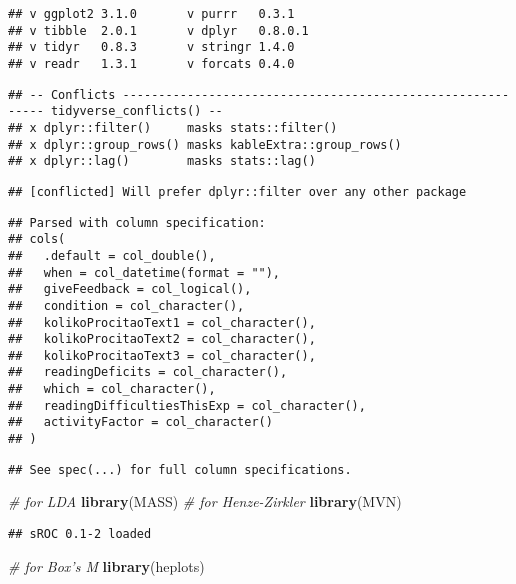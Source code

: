 \documentclass[12pt,]{article}
\newenvironment{Shaded}{\begin{snugshade}}{\end{snugshade}}
\newcommand{\CommentTok}[1]{\textcolor[rgb]{0.56,0.35,0.01}{\textit{#1}}}
\newcommand{\KeywordTok}[1]{\textcolor[rgb]{0.13,0.29,0.53}{\textbf{#1}}}
\newcommand{\NormalTok}[1]{#1}
\begin{document}
\begin{verbatim}
## v ggplot2 3.1.0       v purrr   0.3.1  
## v tibble  2.0.1       v dplyr   0.8.0.1
## v tidyr   0.8.3       v stringr 1.4.0  
## v readr   1.3.1       v forcats 0.4.0
\end{verbatim}

\begin{verbatim}
## -- Conflicts ----------------------------------------------------------- tidyverse_conflicts() --
## x dplyr::filter()     masks stats::filter()
## x dplyr::group_rows() masks kableExtra::group_rows()
## x dplyr::lag()        masks stats::lag()
\end{verbatim}

\begin{verbatim}
## [conflicted] Will prefer dplyr::filter over any other package
\end{verbatim}

\begin{verbatim}
## Parsed with column specification:
## cols(
##   .default = col_double(),
##   when = col_datetime(format = ""),
##   giveFeedback = col_logical(),
##   condition = col_character(),
##   kolikoProcitaoText1 = col_character(),
##   kolikoProcitaoText2 = col_character(),
##   kolikoProcitaoText3 = col_character(),
##   readingDeficits = col_character(),
##   which = col_character(),
##   readingDifficultiesThisExp = col_character(),
##   activityFactor = col_character()
## )
\end{verbatim}

\begin{verbatim}
## See spec(...) for full column specifications.
\end{verbatim}

\begin{Shaded}
\begin{Highlighting}[]
\CommentTok{# for LDA}
\KeywordTok{library}\NormalTok{(MASS)}
\CommentTok{# for Henze-Zirkler}
\KeywordTok{library}\NormalTok{(MVN)}
\end{Highlighting}
\end{Shaded}

\begin{verbatim}
## sROC 0.1-2 loaded
\end{verbatim}

\begin{Shaded}
\begin{Highlighting}[]
\CommentTok{# for Box's M}
\KeywordTok{library}\NormalTok{(heplots)}
\end{Highlighting}
\end{Shaded}
\end{document}

